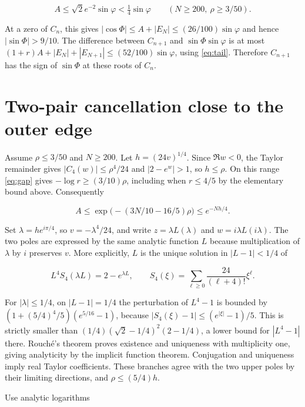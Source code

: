 \documentclass[11pt]{article}
\begin{document}
\begin{equation}
A\le\sqrt2 e^{-2}\sin\varphi<\tfrac14\sin\varphi
\qquad (N\ge200,\ \rho\ge3/50).
\label{eq:bulk}
\end{equation}

At a zero of $C_n$, this gives $|\cos\Phi|\le A+|E_N|\le(26/100)\sin\varphi$ and hence $|\sin\Phi|>9/10$. The difference between $C_{n+1}$ and $\sin\Phi\sin\varphi$ is at most $(1+r)A+|E_N|+|E_{N+1}|\le(52/100)\sin\varphi$, using \eqref{eq:tail}. Therefore $C_{n+1}$ has the sign of $\sin\Phi$ at these roots of $C_n$.


\section{Two-pair cancellation close to the outer edge}

Assume $\rho\le3/50$ and $N\ge200$. Let $h=(24v)^{1/4}$. Since $\Re w<0$, the Taylor remainder gives $|C_4(w)|\le\rho^4/24$ and $|2-e^w|>1$, so $h\le\rho$. On this range \eqref{eq:gap} gives $-\log r\ge(3/10)\rho$, including when $r\le4/5$ by the elementary bound above. Consequently

\begin{equation}
A\le \exp\!\bigl(-(3N/10-16/5)\rho\bigr)\le e^{-Nh/4}.
\label{eq:small-amplitude}
\end{equation}

Set $\lambda=h e^{i\pi/4}$, so $v=-\lambda^4/24$, and write $z=\lambda L(\lambda)$ and $w=i\lambda L(i\lambda)$. The two poles are expressed by the same analytic function $L$ because multiplication of $\lambda$ by $i$ preserves $v$. More explicitly, $L$ is the unique solution in $|L-1|<1/4$ of

\begin{equation*}
L^4 S_4(\lambda L)=2-e^{\lambda L},\qquad
S_4(\xi)=\sum_{\ell\ge0}\frac{24}{(\ell+4)!}\xi^\ell .
\end{equation*}

For $|\lambda|\le1/4$, on $|L-1|=1/4$ the perturbation of $L^4-1$ is bounded by $(1+(5/4)^4/5)(e^{5/16}-1)$, because $|S_4(\xi)-1|\le(e^{|\xi|}-1)/5$. This is strictly smaller than $(1/4)(\sqrt2-1/4)^2(2-1/4)$, a lower bound for $|L^4-1|$ there. Rouché's theorem proves existence and uniqueness with multiplicity one, giving analyticity by the implicit function theorem. Conjugation and uniqueness imply real Taylor coefficients. These branches agree with the two upper poles by their limiting directions, and $\rho\le(5/4)h$.

Use analytic logarithms
\end{document}

